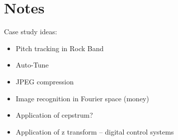 \documentclass[12pt]{book}
\begin{document}
\begin{verbatim}
\end{verbatim}


\begin{verbatim}
\end{verbatim}


\begin{verbatim}
\end{verbatim}


\begin{verbatim}
\end{verbatim}


\begin{verbatim}
\end{verbatim}


\begin{verbatim}
\end{verbatim}


\begin{verbatim}
\end{verbatim}


\begin{verbatim}
\end{verbatim}


\chapter{Notes}

Case study ideas:

\begin{itemize}

\item Pitch tracking in Rock Band

\item Auto-Tune

\item JPEG compression

\item Image recognition in Fourier space (money)

\item Application of cepstrum?

\item Application of z transform -- digital control systems

\end{itemize}
\end{document}
